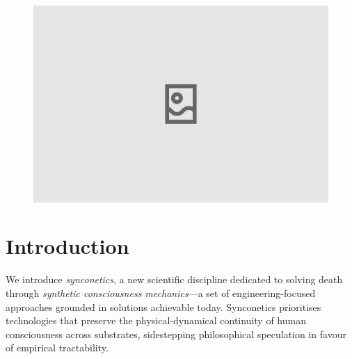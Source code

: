 \documentclass[10pt]{article}
\begin{document}
\begin{sloppypar}

  \begin{figure}[ht]
    \centering
    \includegraphics[width=\textwidth]{figures/cover.png}
    \label{fig:cover}
  \end{figure}
  \newpage



  \pagebreak
  \tableofcontents
  \pagebreak


  \section{Introduction}
  \label{sec:introduction}

  We introduce \emph{synconetics}, a new scientific discipline dedicated to solving death through \emph{synthetic consciousness mechanics}—a set of engineering-focused approaches grounded in solutions achievable today. Synconetics prioritises technologies that preserve the physical-dynamical continuity of human consciousness across substrates, sidestepping philosophical speculation in favour of empirical tractability.


\end{sloppypar}
\end{document}
